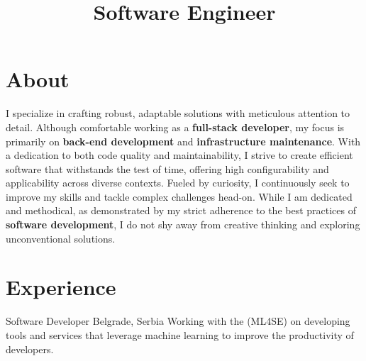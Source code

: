 \documentclass[12pt,a4paper,sans]{moderncv}
\title{Software Engineer}
\begin{document}
\makecvtitle

\section{About}

I specialize in crafting robust, adaptable solutions with meticulous attention
to detail. Although comfortable working as a \textbf{full-stack developer}, my
focus is primarily on \textbf{back-end development} and \textbf{infrastructure maintenance}.
With a dedication to both code quality and maintainability, I strive to create
efficient software that withstands the test of time, offering high configurability
and applicability across diverse contexts. Fueled by curiosity, I continuously
seek to improve my skills and tackle complex challenges head-on. While I am
dedicated and methodical, as demonstrated by my strict adherence to the best
practices of \textbf{software development}, I do not shy away from creative
thinking and exploring unconventional solutions.


\section{Experience}

{Software Developer}
{}
{Belgrade, Serbia}{}
{
    Working with the  (ML4SE) on developing tools and
    services that leverage machine learning to improve the productivity of
    developers.
}
\end{document}
